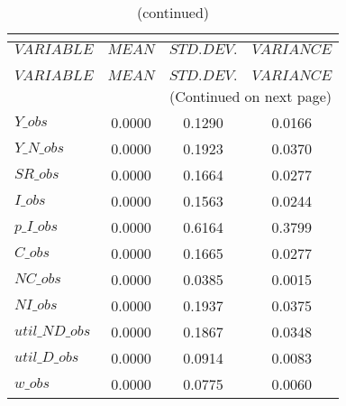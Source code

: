  
\begin{center}
\begin{longtable}{lccc} 
\caption{THEORETICAL MOMENTS}\\
 \label{Table:th_moments}\\
\toprule 
$VARIABLE       $	 & 	 $         MEAN$	 & 	 $    STD. DEV.$	 & 	 $     VARIANCE$\\
\midrule \endfirsthead 
\caption{(continued)}\\
 \toprule \\ 
$VARIABLE       $	 & 	 $         MEAN$	 & 	 $    STD. DEV.$	 & 	 $     VARIANCE$\\
\midrule \endhead 
\midrule \multicolumn{4}{r}{(Continued on next page)} \\ \bottomrule \endfoot 
\bottomrule \endlastfoot 
$Y\_obs         $	 & 	       0.0000	 & 	       0.1290	 & 	       0.0166 \\ 
$Y\_N\_obs      $	 & 	       0.0000	 & 	       0.1923	 & 	       0.0370 \\ 
$SR\_obs        $	 & 	       0.0000	 & 	       0.1664	 & 	       0.0277 \\ 
$I\_obs         $	 & 	       0.0000	 & 	       0.1563	 & 	       0.0244 \\ 
$p\_I\_obs      $	 & 	       0.0000	 & 	       0.6164	 & 	       0.3799 \\ 
$C\_obs         $	 & 	       0.0000	 & 	       0.1665	 & 	       0.0277 \\ 
$NC\_obs        $	 & 	       0.0000	 & 	       0.0385	 & 	       0.0015 \\ 
$NI\_obs        $	 & 	       0.0000	 & 	       0.1937	 & 	       0.0375 \\ 
$util\_ND\_obs  $	 & 	       0.0000	 & 	       0.1867	 & 	       0.0348 \\ 
$util\_D\_obs   $	 & 	       0.0000	 & 	       0.0914	 & 	       0.0083 \\ 
$w\_obs         $	 & 	       0.0000	 & 	       0.0775	 & 	       0.0060 \\ 
\end{longtable}
 \end{center}

